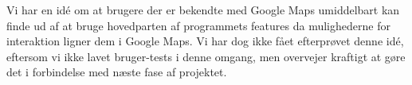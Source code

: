 Vi har en idé om at brugere der er bekendte med Google Maps umiddelbart kan finde ud af at bruge hovedparten af programmets features da mulighederne for interaktion ligner dem i Google Maps. Vi har dog ikke fået efterprøvet denne idé, eftersom vi ikke lavet bruger-tests i denne omgang, men overvejer kraftigt at gøre det i forbindelse med næste fase af projektet.